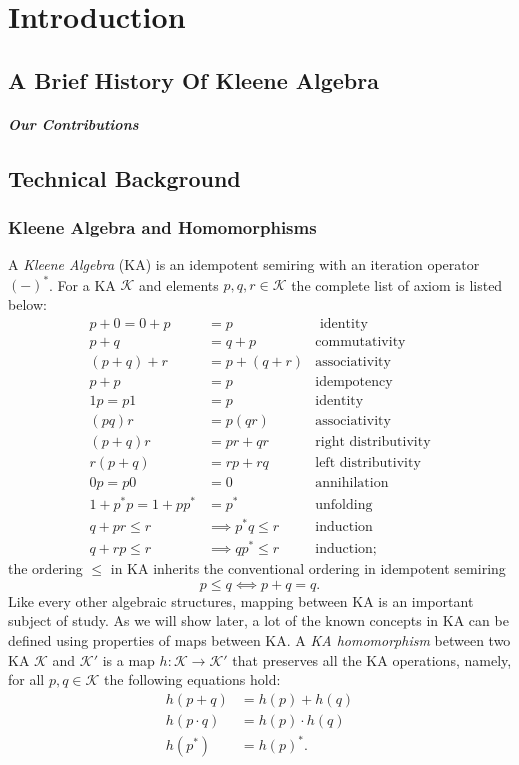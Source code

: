 \chapter{Introduction}
\label{chapter:introduction}
\thispagestyle{myheadings}

\section{A Brief History Of Kleene Algebra}
\label{sec:history}


\paragraph{Our Contributions}

\section{Technical Background}

\subsection{Kleene Algebra and Homomorphisms}

A \emph{Kleene Algebra} (KA) is an idempotent semiring with an iteration operator \((-)^*\).
For a KA \(𝒦\) and elements \(p, q, r ∈ 𝒦\) the complete list of axiom is listed below:
\begin{align*}
  p + 0 = 0 + p & = p & \text{ identity} \\
  p + q &= q + p & \text{commutativity}\\
  (p + q) + r & = p + (q + r) & \text{associativity} \\
  p + p & = p & \text{idempotency} \\
  1 p = p 1 & = p & \text{identity} \\
  (p  q)  r & = p  (q  r) & \text{associativity}\\
  (p + q) r & = pr + qr & \text{right distributivity} \\
  r (p + q) & = rp + rq & \text{left distributivity} \\
  0 p = p 0 & = 0 & \text{annihilation} \\
  1 + p^* p = 1 + p p^* & = p^* 
  & \text{unfolding} \\
  q + pr ≤ r & ⟹ p^* q ≤ r & 
  \text{induction} \\
  q + rp ≤ r & ⟹ qp^* ≤ r & 
  \text{induction};
\end{align*} 
the ordering \(≤\) in KA inherits the conventional ordering in idempotent semiring
\[ p ≤ q ⟺ p + q = q.\]
Like every other algebraic structures, mapping between KA is an important subject of study.
As we will show later, a lot of the known concepts in KA 
can be defined using properties of maps between KA.
A \emph{KA homomorphism} between two KA \(𝒦\) and \(𝒦'\) is a map \(h: 𝒦 → 𝒦'\)
that preserves all the KA operations, namely, for all \(p, q ∈ 𝒦\) the following equations hold:
\begin{align*}
  h(p + q) &= h(p) + h(q) \\  
  h(p ⋅ q) &= h(p) ⋅ h(q) \\  
  h(p^*) &= h(p)^*.
\end{align*}


